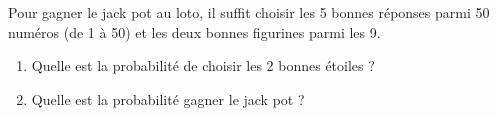 
Pour gagner le jack pot au loto, il suffit choisir les 5 bonnes réponses parmi 50 numéros (de 1 à 50) et les deux bonnes figurines parmi les 9.
\begin{enumerate}
\item Quelle est la probabilité de choisir les 2 bonnes étoiles ?
\item Quelle est la probabilité gagner le jack pot ?
\end{enumerate}